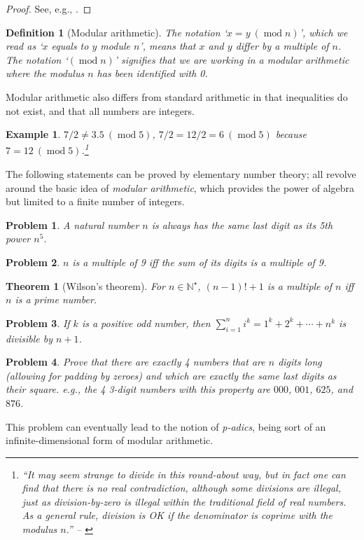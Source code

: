 \documentclass[oneside]{book}
\numberwithin{equation}{section}
\newtheorem{definition}{Definition}[section]
\newtheorem{theorem}{Theorem}[section]
\newtheorem{example}{Example}[section]
\newtheorem{problem}{Problem}[section]
\begin{document}
\begin{proof}[Proof]
	See, e.g., \cite[p. 4]{Gelca_Andreescu2017}.
\end{proof}

\begin{definition}[Modular arithmetic]
	The notation `$x = y\ (\operatorname{mod} n)$', which we read as `$x$ equals to $y$ module $n$', means that $x$ and $y$ differ by a multiple of $n$. The notation `$(\operatorname{mod} n)$' signifies that we are working in a \emph{modular arithmetic} where the \emph{modulus $n$} has been identified with 0.
\end{definition}
Modular arithmetic also differs from standard arithmetic in that inequalities do not exist, and that all numbers are integers.

\begin{example}
	$7/2\ne 3.5\ (\operatorname{mod} 5)$, $7/2 = 12/2 = 6\ (\operatorname{mod} 5)$ because $7 = 12\ (\operatorname{mod} 5)$.\footnote{``It may seem strange to divide in this round-about way, but in fact one can find that there is no real contradiction, although some divisions are illegal, just as division-by-zero is illegal within the traditional field of real numbers. As a general rule, division is OK if the denominator is coprime with the modulus $n$.'' -- \cite[p. 10]{Tao2006}}
\end{example}
The following statements can be proved by elementary number theory; all revolve around the basic idea of \textit{modular arithmetic}, which provides the power of algebra but limited to a finite number of integers.
\begin{problem}
	A natural number $n$ is always has the same last digit as its 5th power $n^5$.
\end{problem}

\begin{problem}
	$n$ is a multiple of 9 iff the sum of its digits is a multiple of 9.
\end{problem}

\begin{theorem}[Wilson's theorem]
	For $n\in\mathbb{N}^\star$, $(n - 1)! + 1$ is a multiple of $n$ iff $n$ is a prime number.
\end{theorem}

\begin{problem}
	If $k$ is a positive odd number, then $\sum_{i=1}^n i^k = 1^k + 2^k + \cdots + n^k$ is divisible by $n + 1$.
\end{problem}

\begin{problem}
	Prove that there are exactly 4 numbers that are $n$ digits long (allowing for padding by zeroes) and which are exactly the same last digits as their square. e.g., the 4 3-digit numbers with this property are $000$, $001$, $625$, and $876$.
\end{problem}
This problem can eventually lead to the notion of \textit{p-adics}, being sort of an infinite-dimensional form of modular arithmetic.
\end{document}
